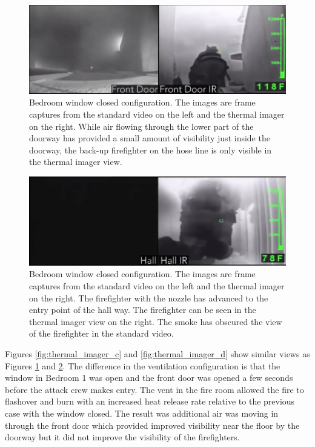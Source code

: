 \documentclass[12pt,oneside]{book}
\begin{document}
\begin{figure}[H]
\centering
\includegraphics[width=1.0\textwidth]{../0_Images/Tactical_Considerations/Thermal_Imager/Exp6FDpair.PNG}
\caption[Thermal Imager A]{Bedroom window closed configuration. The images are frame captures from the standard video on the left and the thermal imager on the right. While air flowing through the lower part of the doorway has provided a small amount of visibility just inside the doorway, the back-up firefighter on the hose line is only visible in the thermal imager view.}
\label{fig:thermal_imager_a}
\end{figure}

\begin{figure}[H]
\centering
\includegraphics[width=1.0\textwidth]{../0_Images/Tactical_Considerations/Thermal_Imager/Exp6Hallpair.png}
\caption[Thermal Imager B]{Bedroom window closed configuration.  The images are frame captures from the standard video on the left and the thermal imager on the right. The firefighter with the nozzle has advanced to the entry point of the hall way. The firefighter can be seen in the thermal imager view on the right. The smoke has obscured the view of the firefighter in the standard video.}
\label{fig:thermal_imager_b}
\end{figure}

Figures \ref{fig:thermal_imager_c} and \ref{fig:thermal_imager_d} show similar views as Figures \ref{fig:thermal_imager_a} and \ref{fig:thermal_imager_b}. The difference in the ventilation configuration is that the window in Bedroom 1 was open and the front door was opened a few seconds before the attack crew makes entry.  The vent in the fire room allowed the fire to flashover and burn with an increased heat release rate relative to the previous case with the window closed. The result was additional air was moving in through the front door which provided improved visibility near the floor by the doorway but it did not improve the visibility of the firefighters. 
\end{document}
